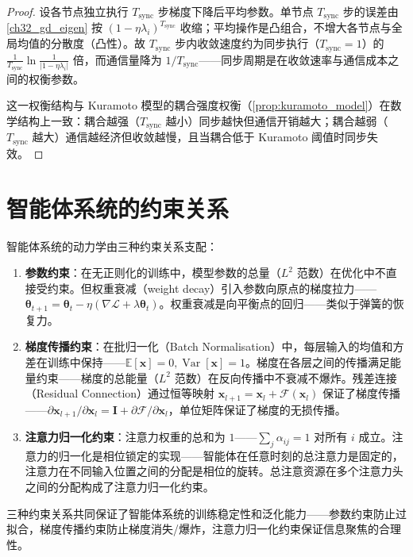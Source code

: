 \begin{proof}
设各节点独立执行 $T_{\text{sync}}$ 步梯度下降后平均参数。单节点 $T_{\text{sync}}$ 步的误差由 \cref{ch32_gd_eigen} 按 $(1-\eta\lambda_i)^{T_{\text{sync}}}$ 收缩；平均操作是凸组合，不增大各节点与全局均值的分散度（凸性）。故 $T_{\text{sync}}$ 步内收敛速度约为同步执行（$T_{\text{sync}}=1$）的 $\frac{1}{T_{\text{sync}}}\ln\frac{1}{|1-\eta\lambda_i|}$ 倍，而通信量降为 $1/T_{\text{sync}}$——同步周期是在收敛速率与通信成本之间的权衡参数。

这一权衡结构与 Kuramoto 模型的耦合强度权衡（\cref{prop:kuramoto_model}）在数学结构上一致：耦合越强（$T_{\text{sync}}$ 越小）同步越快但通信开销越大；耦合越弱（$T_{\text{sync}}$ 越大）通信越经济但收敛越慢，且当耦合低于 Kuramoto 阈值时同步失效。
\end{proof}

\section{智能体系统的约束关系}

\begin{theorem}[智能体系统的三种约束关系]\label{thm:agent_conservation}
智能体系统的动力学由三种约束关系支配：
\begin{enumerate}[label=(\roman*)]
    \item \textbf{参数约束}：在无正则化的训练中，模型参数的总量（$L^2$ 范数）在优化中不直接受约束。但权重衰减（weight decay）引入参数向原点的梯度拉力——$\boldsymbol{\theta}_{t+1} = \boldsymbol{\theta}_t - \eta(\nabla\mathcal{L} + \lambda \boldsymbol{\theta}_t)$。权重衰减是向平衡点的回归——类似于弹簧的恢复力。
    \item \textbf{梯度传播约束}：在批归一化（Batch Normalisation）中，每层输入的均值和方差在训练中保持——$\mathbb{E}[\mathbf{x}] = 0, \operatorname{Var}[\mathbf{x}] = 1$。梯度在各层之间的传播满足能量约束——梯度的总能量（$L^2$ 范数）在反向传播中不衰减不爆炸。残差连接（Residual Connection）通过恒等映射 $\mathbf{x}_{l+1} = \mathbf{x}_l + \mathcal{F}(\mathbf{x}_l)$ 保证了梯度传播——$\partial \mathbf{x}_{l+1}/\partial \mathbf{x}_l = \mathbf{I} + \partial \mathcal{F}/\partial \mathbf{x}_l$，单位矩阵保证了梯度的无损传播。
    \item \textbf{注意力归一化约束}：注意力权重的总和为 $1$——$\sum_j \alpha_{ij} = 1$ 对所有 $i$ 成立。注意力的归一化是相位锁定的实现——智能体在任意时刻的总注意力是固定的，注意力在不同输入位置之间的分配是相位的旋转。总注意资源在多个注意力头之间的分配构成了注意力归一化约束。
\end{enumerate}
三种约束关系共同保证了智能体系统的训练稳定性和泛化能力——参数约束防止过拟合，梯度传播约束防止梯度消失/爆炸，注意力归一化约束保证信息聚焦的合理性。
\end{theorem}

